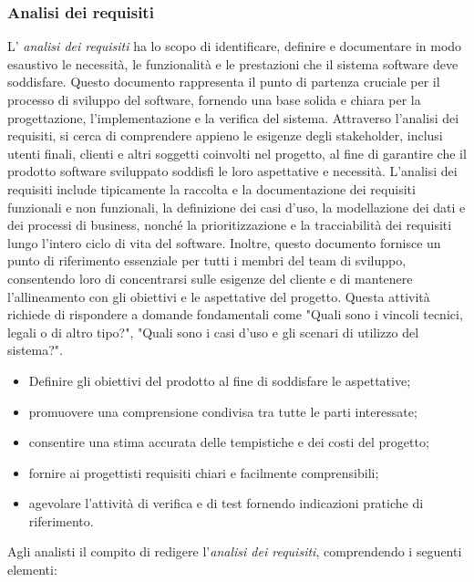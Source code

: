 \subsubsection{Analisi dei requisiti}
L' \textit{analisi dei requisiti} ha lo scopo di identificare, definire e documentare in modo esaustivo le necessità, le funzionalità e le prestazioni che il sistema software deve soddisfare. Questo documento rappresenta il punto di partenza cruciale per il processo di sviluppo del software, fornendo una base solida e chiara per la progettazione, l'implementazione e la verifica del sistema. Attraverso l'analisi dei requisiti, si cerca di comprendere appieno le esigenze degli stakeholder, inclusi utenti finali, clienti e altri soggetti coinvolti nel progetto, al fine di garantire che il prodotto software sviluppato soddisfi le loro aspettative e necessità. L'analisi dei requisiti include tipicamente la raccolta e la documentazione dei requisiti funzionali e non funzionali, la definizione dei casi d'uso, la modellazione dei dati e dei processi di business, nonché la prioritizzazione e la tracciabilità dei requisiti lungo l'intero ciclo di vita del software. Inoltre, questo documento fornisce un punto di riferimento essenziale per tutti i membri del team di sviluppo, consentendo loro di concentrarsi sulle esigenze del cliente e di mantenere l'allineamento con gli obiettivi e le aspettative del progetto.
Questa attività richiede di rispondere a domande fondamentali come "Quali sono i vincoli tecnici, legali o di altro tipo?", "Quali sono i casi d'uso e gli scenari di utilizzo del sistema?".
\newpage
{}
\begin{itemize}
	\item Definire gli obiettivi del prodotto al fine di soddisfare le aspettative;
	\item promuovere una comprensione condivisa tra tutte le parti interessate;
	\item consentire una stima accurata delle tempistiche e dei costi del progetto;
	\item fornire ai progettisti requisiti chiari e facilmente comprensibili;
	\item agevolare l'attività di verifica e di test fornendo indicazioni pratiche di riferimento.
\end{itemize}
Agli analisti il compito di redigere l'\textit{analisi dei requisiti}, comprendendo i seguenti elementi:
